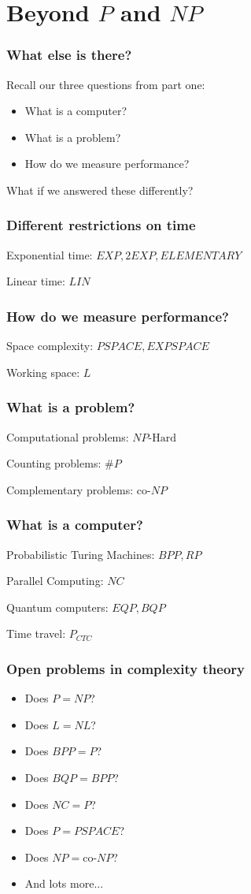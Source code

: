 \documentclass[aspectratio=169]{beamer}
\begin{document}
\section{Beyond $P$ and $NP$}

\begin{frame}
\frametitle{What else is there?}
Recall our three questions from part one:
\begin{itemize}
    \item What is a computer?
    \item What is a problem?
    \item How do we measure performance?
\end{itemize}
What if we answered these differently?
\end{frame}

\begin{frame}
\frametitle{Different restrictions on time}
Exponential time: $EXP, 2EXP, ELEMENTARY$

Linear time: $LIN$
\end{frame}

\begin{frame}
\frametitle{How do we measure performance?}
Space complexity: $PSPACE, EXPSPACE$

Working space: $L$
\end{frame}

\begin{frame}
\frametitle{What is a problem?}
Computational problems: $NP\text{-Hard}$

Counting problems: $\#P$

Complementary problems: $\text{co-}NP$
\end{frame}

\begin{frame}
\frametitle{What is a computer?}
Probabilistic Turing Machines: $BPP, RP$

Parallel Computing: $NC$

Quantum computers:  $EQP, BQP$

Time travel: $P_{CTC}$
\end{frame}

\begin{frame}
\frametitle{Open problems in complexity theory}
\begin{itemize}
    \item<1-> Does $P = NP$?
    \item<2-> Does $L = NL$?
    \item<3-> Does $BPP = P$?
    \item<4-> Does $BQP = BPP$?
    \item<5-> Does $NC = P$?
    \item<6-> Does $P = PSPACE$?
    \item<7-> Does $NP = \text{co-}NP$?
    \item<8-> And lots more...
\end{itemize}
\end{frame}
\end{document}

